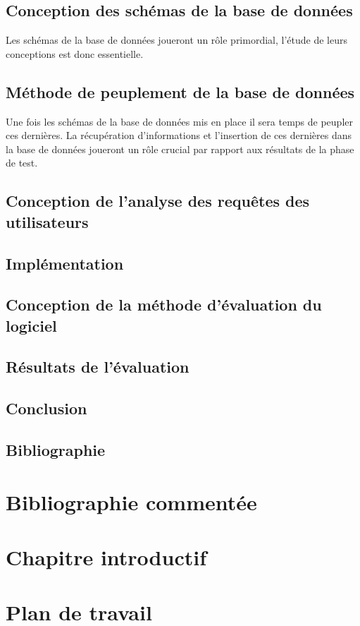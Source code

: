 \documentclass[11pt]{article}
\begin{document}
\subsection{Conception des schémas de la base de données}
Les schémas de la base de données joueront un rôle primordial, l'étude de leurs conceptions est donc essentielle.
\subsection{Méthode de peuplement de la base de données}
Une fois les schémas de la base de données mis en place il sera temps de peupler ces dernières. La récupération d'informations et l'insertion de ces dernières dans la base de données joueront un rôle crucial par rapport aux résultats de la phase de test.
\subsection{Conception de l'analyse des requêtes des utilisateurs}

\subsection{Implémentation}
\subsection{Conception de la méthode d'évaluation du logiciel}
\subsection{Résultats de l'évaluation}
\subsection{Conclusion}
\subsection{Bibliographie}


\section{Bibliographie commentée}

\section{Chapitre introductif}

\section{Plan de travail}
\end{document}
